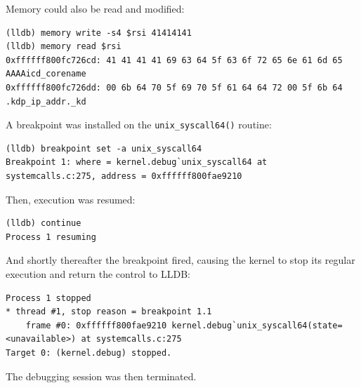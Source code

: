 Memory could also be read and modified:
\begin{lstlisting}[style=lldbsession]
(lldb) memory write -s4 $rsi 41414141
(lldb) memory read $rsi
0xffffff800fc726cd: 41 41 41 41 69 63 64 5f 63 6f 72 65 6e 61 6d 65  AAAAicd_corename
0xffffff800fc726dd: 00 6b 64 70 5f 69 70 5f 61 64 64 72 00 5f 6b 64  .kdp_ip_addr._kd
\end{lstlisting}

A breakpoint was installed on the \lstinline{unix_syscall64()} routine:
\begin{lstlisting}[style=lldbsession]
(lldb) breakpoint set -a unix_syscall64
Breakpoint 1: where = kernel.debug`unix_syscall64 at systemcalls.c:275, address = 0xffffff800fae9210
\end{lstlisting}

Then, execution was resumed:
\begin{lstlisting}[style=lldbsession]
(lldb) continue
Process 1 resuming
\end{lstlisting}

And shortly thereafter the breakpoint fired, causing the kernel to stop its regular execution and return the control to LLDB:
\begin{lstlisting}[style=lldbsession]
Process 1 stopped
* thread #1, stop reason = breakpoint 1.1
    frame #0: 0xffffff800fae9210 kernel.debug`unix_syscall64(state=<unavailable>) at systemcalls.c:275
Target 0: (kernel.debug) stopped.
\end{lstlisting}

The debugging session was then terminated.


